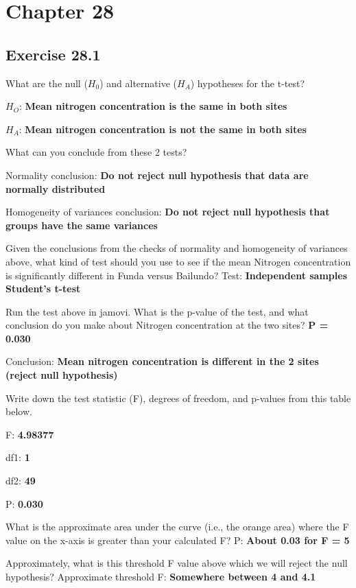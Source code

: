\documentclass[
  openany]{krantz}
\begin{document}
\hypertarget{chapter-28}{%
\section{Chapter 28}\label{chapter-28}}

\hypertarget{exercise-28.1}{%
\subsection{Exercise 28.1}\label{exercise-28.1}}

What are the null (\(H_{0}\)) and alternative (\(H_{A}\)) hypotheses for the t-test?

\(H_{O}\): \textbf{Mean nitrogen concentration is the same in both sites}

\(H_{A}\): \textbf{Mean nitrogen concentration is not the same in both sites}

What can you conclude from these 2 tests?

Normality conclusion: \textbf{Do not reject null hypothesis that data are normally distributed}

Homogeneity of variances conclusion: \textbf{Do not reject null hypothesis that groups have the same variances}

Given the conclusions from the checks of normality and homogeneity of variances above, what kind of test should you use to see if the mean Nitrogen concentration is significantly different in Funda versus Bailundo? Test: \textbf{Independent samples Student's t-test}

Run the test above in jamovi. What is the p-value of the test, and what conclusion do you make about Nitrogen concentration at the two sites? \textbf{P = 0.030}

Conclusion: \textbf{Mean nitrogen concentration is different in the 2 sites (reject null hypothesis)}

Write down the test statistic (F), degrees of freedom, and p-values from this table below.

F: \textbf{4.98377}

df1: \textbf{1}

df2: \textbf{49}

P: \textbf{0.030}

What is the approximate area under the curve (i.e., the orange area) where the F value on the x-axis is greater than your calculated F? P: \textbf{About 0.03 for F = 5}

Approximately, what is this threshold F value above which we will reject the null hypothesis?
Approximate threshold F: \textbf{Somewhere between 4 and 4.1}
\end{document}
